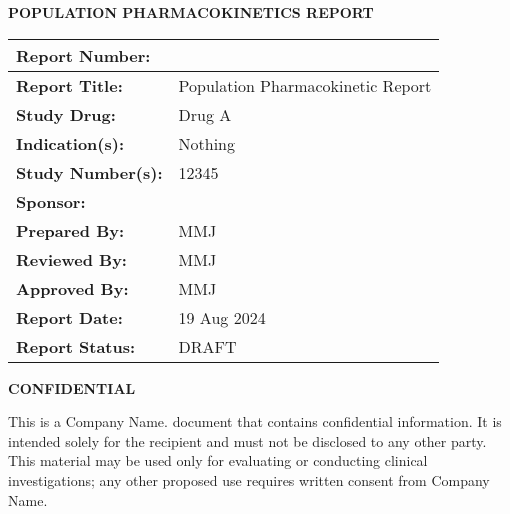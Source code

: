 \documentclass[
  letterpaper,
  toc=chapterentrywithdots,
  11pt,
  headings=small]{scrreprt}
\renewcommand*\contentsname{Table of contents}
\newcommand\contentsname{Table of contents}
\begin{document}
\thispagestyle{empty}
\vskip2cm
{\centerline{\textbf{POPULATION PHARMACOKINETICS REPORT}}}
\vskip1cm
\begin{table}[!h]
      \setlength{\tabcolsep}{5pt}
      \renewcommand{\arraystretch}{1.5}
      \begin{tabularx}{\textwidth}{|p{}|X|}
            \hline
            \textbf{Report Number:} & \\
            \hline
            \textbf{Report Title:} & Population Pharmacokinetic
Report \\
            \hline
            \textbf{Study Drug:} &  Drug A\\
            \hline
            \textbf{Indication(s):} & Nothing\\
            \hline
            \textbf{Study Number(s):} & 12345\\
            \hline
            \textbf{Sponsor:} & \\
            \hline
            \textbf{Prepared By:} & MMJ\\
            \hline
            \textbf{Reviewed By:} & MMJ \\
            \hline
            \textbf{Approved By:} & MMJ\\
            \hline
            \textbf{Report Date:} & 19 Aug 2024\\
            \hline
            \textbf{Report Status:}  & DRAFT\\
            \hline
      \end{tabularx}
\end{table}
\vskip0.5cm
\begin{center}
{\textbf{CONFIDENTIAL}}
\begin{mdframed}
    {\normalsize This is a Company Name. document that contains
confidential information. It is intended solely for the recipient and
must not be disclosed to any other party. This material may be used only
for evaluating or conducting clinical investigations; any other proposed
use requires written consent from Company Name.}
\end{mdframed}
\end{center}
\ifdefined\Shaded\renewenvironment{Shaded}{\begin{tcolorbox}[sharp corners, interior hidden, borderline west={3pt}{0pt}{shadecolor}, boxrule=0pt, breakable, enhanced, frame hidden]}{\end{tcolorbox}}\fi

\renewcommand*\contentsname{Contents}
{
\hypersetup{linkcolor=blue}
\setcounter{tocdepth}{2}
\tableofcontents
}
\listoffigures
\listoftables
{}
\end{document}
